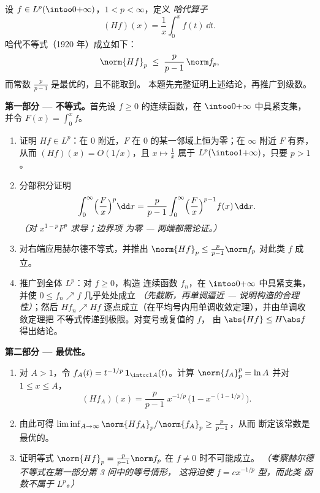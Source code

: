 \begin{problem}\label{pb:b3:lp:1}
设 $f \in L^p(\intoo0{+\infty})$，$1 < p < \infty$，定义
\emph{哈代算子}
\[
(Hf)(x) = \frac1x\int_0^x f(t)\,\dd t .
\]
哈代不等式（1920 年）成立如下：
\[
\norm{Hf}_p \;\leq\; \frac{p}{p-1}\,\norm f_p ,
\]
而常数 $\frac p{p-1}$ 是最优的，且不能取到。
本题先完整证明上述结论，再推广到级数。

\medskip
\noindent\textbf{第一部分 --- 不等式。}首先设 $f
\geq 0$ 的连续函数，在
$\intoo0{+\infty}$ 中具紧支集，并令 $F(x) = \int_0^xf$。
\begin{enumerate}
  \item 证明 $Hf \in L^p$：在 $0$ 附近，$F$ 在
        $0$ 的某一邻域上恒为零；在 $\infty$ 附近 $F$ 有界，从而
        $(Hf)(x) = O(1/x)$，且 $x \mapsto \frac1x$ 属于
        $L^p(\intoo1{+\infty})$，只要 $p > 1$。
  \item 分部积分证明
        \[
        \int_0^\infty \Bigl(\frac Fx\Bigr)^p\dd x
        = \frac{p}{p-1}\int_0^\infty\Bigl(\frac
        Fx\Bigr)^{p-1}f(x)\,\dd x .
        \]
        \emph{（对 $x^{1-p}F^p$ 求导；边界项
        为零 --- 两端都需论证。）}
  \item 对右端应用赫尔德不等式，并推出
        $\norm{Hf}_p \leq \frac p{p-1}\norm f_p$ 对此类 $f$ 成立。
  \item 推广到全体 $L^p$：对 $f \geq 0$，构造
        连续函数 $f_n$，在
        $\intoo0{+\infty}$ 中具紧支集，并使 $0 \leq f_n \nearrow f$ 几乎处处成立
        \emph{（先截断，再单调逼近 ---
        说明构造的合理性）}；然后 $Hf_n \nearrow Hf$
        逐点成立（在平均号内用单调收敛定理），并由单调收敛定理把
        不等式传递到极限。对变号或复值的 $f$，
        由 $\abs{Hf} \leq H\abs f$ 得出结论。
\end{enumerate}

\medskip
\noindent\textbf{第二部分 --- 最优性。}
\begin{enumerate}[resume]
  \item 对 $A > 1$，令 $f_A(t) = t^{-1/p}\,\mathbf
        1_{\intcc1A}(t)$。计算 $\norm{f_A}_p^p = \ln A$
        并对 $1 \leq x \leq A$，
        \[
        (Hf_A)(x) = \frac p{p-1}\;x^{-1/p}\,
        \bigl(1 - x^{-(1 - 1/p)}\bigr).
        \]
  \item 由此可得 $\liminf_{A\to\infty} \norm{Hf_A}_p/
        \norm{f_A}_p \geq \frac{p}{p-1}$，从而
        断定该常数是最优的。
  \item 证明等式 $\norm{Hf}_p = \frac
        p{p-1}\norm f_p$ 在 $f \neq 0$ 时不可能成立。
        \emph{（考察赫尔德不等式在第一部分第 3 问中的等号情形，
        这将迫使 $f = cx^{-1/p}$ 型，而此类
        函数不属于 $L^p$。）}
\end{enumerate}


\end{problem}
